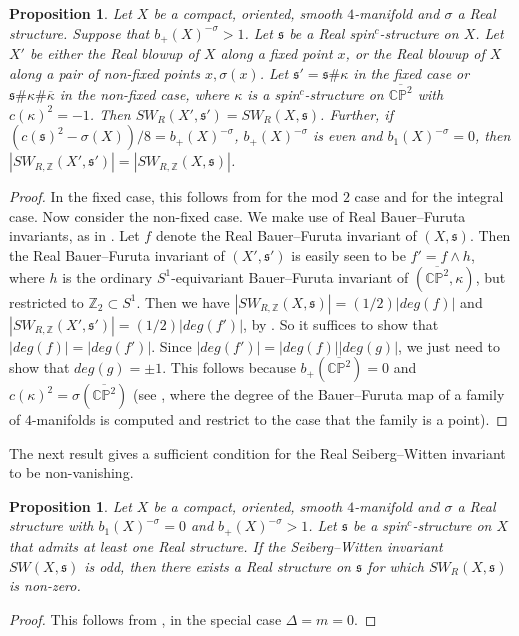 \documentclass{amsart}
\newtheorem{proposition}[theorem]{Proposition}
\theoremstyle{definition}
\theoremstyle{remark}
\numberwithin{equation}{section}
\begin{document}
\begin{proposition}\label{prop:blowup}
Let $X$ be a compact, oriented, smooth $4$-manifold and $\sigma$ a Real structure. Suppose that $b_+(X)^{-\sigma} > 1$. Let $\mathfrak{s}$ be a Real spin$^c$-structure on $X$. Let $X'$ be either the Real blowup of $X$ along a fixed point $x$, or the Real blowup of $X$ along a pair of non-fixed points $x,\sigma(x)$. Let $\mathfrak{s}' = \mathfrak{s} \# \kappa$ in the fixed case or $\mathfrak{s} \# \kappa \# \overline{\kappa}$ in the non-fixed case, where $\kappa$ is a spin$^c$-structure on $\overline{\mathbb{CP}^2}$ with $c(\kappa)^2 = -1$. Then $SW_R(X' , \mathfrak{s}') = SW_R(X , \mathfrak{s})$. Further, if $(c(\mathfrak{s})^2 - \sigma(X))/8 = b_+(X)^{-\sigma}$, $b_+(X)^{-\sigma}$ is even and $b_1(X)^{-\sigma} = 0$, then $|SW_{R,\mathbb{Z}}(X',\mathfrak{s}')| = |SW_{R,\mathbb{Z}}(X,\mathfrak{s})|$.
\end{proposition}
\begin{proof}
In the fixed case, this follows from \cite[Theorem 9.1]{bar3} for the mod $2$ case and \cite[Theorem 9.3]{bar3} for the integral case. Now consider the non-fixed case. We make use of Real Bauer--Furuta invariants, as in \cite{bar3}. Let $f$ denote the Real Bauer--Furuta invariant of $(X,\mathfrak{s})$. Then the Real Bauer--Furuta invariant of $(X' , \mathfrak{s}')$ is easily seen to be $f' = f \wedge h$, where $h$ is the ordinary $S^1$-equivariant Bauer--Furuta invariant of $(\overline{\mathbb{CP}^2} , \kappa)$, but restricted to $\mathbb{Z}_2 \subset S^1$. Then we have $|SW_{R,\mathbb{Z}}(X , \mathfrak{s})| = (1/2)|deg(f)|$ and $|SW_{R,\mathbb{Z}}(X' , \mathfrak{s}')| = (1/2) |deg(f')|$, by \cite[Proposition 5.9 (2)]{bar3}. So it suffices to show that $|deg(f)| = |deg(f')|$. Since $|deg(f')| = |deg(f)| |deg(g)|$, we just need to show that $deg(g) = \pm 1$. This follows because $b_+( \overline{\mathbb{CP}^2} ) = 0$ and $c(\kappa)^2 = \sigma( \overline{\mathbb{CP}^2})$ (see \cite[]{bar}, where the degree of the Bauer--Furuta map of a family of $4$-manifolds is computed and restrict to the case that the family is a point).
\end{proof}

The next result gives a sufficient condition for the Real Seiberg--Witten invariant to be non-vanishing.

\begin{proposition}\label{prop:loc}
Let $X$ be a compact, oriented, smooth $4$-manifold and $\sigma$ a Real structure with $b_1(X)^{-\sigma} = 0$ and $b_+(X)^{-\sigma} > 1$. Let $\mathfrak{s}$ be a spin$^c$-structure on $X$ that admits at least one Real structure. If the Seiberg--Witten invariant $SW(X , \mathfrak{s})$ is odd, then there exists a Real structure on $\mathfrak{s}$ for which $SW_R(X , \mathfrak{s})$ is non-zero.
\end{proposition}
\begin{proof}
This follows from \cite[Theorem 1.8]{bar3}, in the special case $\Delta = m = 0$.
\end{proof}
\end{document}
